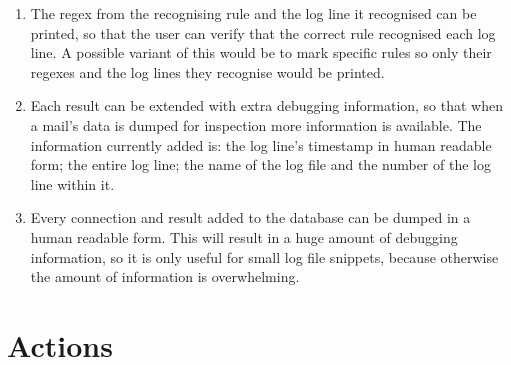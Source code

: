 \begin{enumerate}

    \item The regex from the recognising rule and the log line it
        recognised can be printed, so that the user can verify that the
        correct rule recognised each log line.  A possible variant of this
        would be to mark specific rules so only their regexes and the log
        lines they recognise would be printed.

    \item Each result can be extended with extra debugging information, so
        that when a mail's data is dumped for inspection more information
        is available.  The information currently added is: the log line's
        timestamp in human readable form; the entire log line; the name of
        the log file and the number of the log line within it.

    \item Every connection and result added to the database can be dumped
        in a human readable form.  This will result in a huge amount of
        debugging information, so it is only useful for small log file
        snippets, because otherwise the amount of information is
        overwhelming.

\end{enumerate}

\section{Actions}

\label{actions in implementation}

